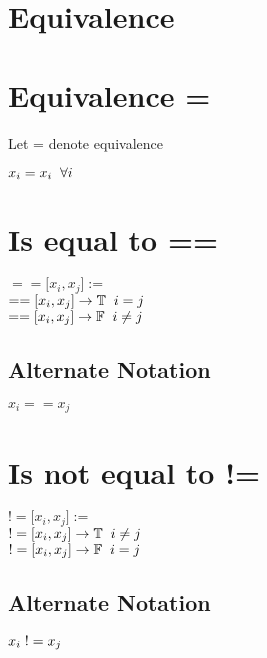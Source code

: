 \documentclass[11pt]{article}
\begin{document}
\section*{Equivalence }





\section{Equivalence =}
Let = denote equivalence
\begin{center}
$x_i = x_i \hspace{2mm} \forall i$
\end{center}




\section{Is equal to ==}
\begin{center}
$==\lbrack x_i,x_j \rbrack :=$
\\
$==\lbrack x_i,x_j\rbrack \rightarrow \mathbb{T} \hspace{2mm} i = j$
\\
$==\lbrack x_i,x_j\rbrack \rightarrow \mathbb{F} \hspace{2mm} i \neq j$
\end{center}

\subsection{Alternate Notation}
\begin{center}
$x_i == x_j$
\end{center}





\section{Is not equal to !=}
\begin{center}
$!=\lbrack x_i,x_j \rbrack :=$
\\
$!=\lbrack x_i,x_j\rbrack \rightarrow \mathbb{T} \hspace{2mm} i \neq j$
\\
$!=\lbrack x_i,x_j\rbrack \rightarrow \mathbb{F} \hspace{2mm} i = j$
\end{center}

\subsection{Alternate Notation}
\begin{center}
$x_i \hspace{1mm} != x_j$
\end{center}
\end{document}
